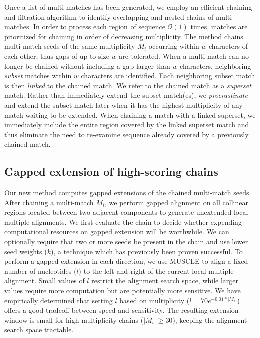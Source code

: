 \documentclass{llncs}
\begin{document}
Once a list of multi-matches has been generated, we employ an
efficient chaining and filtration algorithm to identify overlapping
and nested chains of multi-matches\cite{ref-procrast}. In order to
process each region of sequence $\mathcal{O}(1)$ times, matches
are prioritized for chaining in order of decreasing multiplicity.  The
method chains multi-match seeds of the same multiplicity $M_{i}$
occurring within $w$ characters of each other, thus gaps of up to size
$w$ are tolerated.  When a multi-match can
no longer be chained without including a gap larger than $w$
characters, neighboring \textit{subset} matches within $w$ characters
are identified. Each neighboring subset match is then \textit{linked}
to the chained match. We refer to the chained match as a
\textit{superset} match. Rather than immediately extend the subset
match(es), we \textit{procrastinate} and extend the subset match later
when it has the highest multiplicity of any match waiting to be
extended. When chaining a match with a linked superset, we immediately
include the entire region covered by the linked superset match and
thus eliminate the need to re-examine sequence already covered by a
previously chained match.

\subsection{Gapped extension of high-scoring chains}
Our new method computes gapped extensions of the chained multi-match seeds.
After chaining a multi-match $M_i$, we perform gapped alignment on all
collinear regions located between two adjacent components to generate
unextended local multiple alignments. We first evaluate the chain to
decide whether expending computational resources on gapped extension
will be worthwhile. We can optionally require that two or more seeds be present
in the chain and use lower seed weights ($k$), a technique which has
previously been proven
successful\cite{ref-blastz,ref-gappedblast,ref-blat}.  To perform a
gapped extension in each direction, we use MUSCLE to align a fixed
number of nucleotides ($l$) to the left and right of the current local
multiple alignment.  Small values of $l$ restrict the alignment search
space, while larger values require more computation but are
potentially more sensitive.  We have empirically determined that
setting $l$ based on multiplicity ($l = 70e^{-0.01*|M_{i}|}$) offers a
good tradeoff between speed and sensitivity.  The resulting extension
window is small for high multiplicity chains ($|M_{i}|\geq 30$),
keeping the alignment search space tractable.
\end{document}
